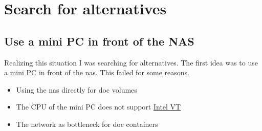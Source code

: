 

\section{Search for alternatives}

\subsection{Use a mini PC in front of the NAS}

Realizing this situation I was searching for alternatives. The first idea was
to use a \href{https://www.zotac.com/at/product/mini_pcs/id41-plus}{mini PC} in
front of the \gls{nas}. This failed for some reasons.

\begin{itemize}
    \item Using the \gls{nas} directly for \gls{doc} volumes
    \item The CPU of the mini PC does not support \href{https://en.wikipedia.org/wiki/X86_virtualization}{Intel VT}
    \item The network as bottleneck for \gls{doc} containers
\end{itemize}

